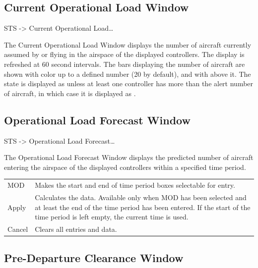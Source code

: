 \documentclass[a4paper,oneside,11pt]{memoir}
\begin{document}
\subsection{Current Operational Load Window}\label{win:colw}

 STS -> Current Operational Load…


The Current Operational Load Window displays the number of aircraft currently assumed by or flying in the airspace of the displayed controllers. The display is refreshed at 60 second intervals. The bars displaying the number of aircraft are shown with  color up to a defined number (20 by default), and with  above it. The state is displayed as  unless at least one controller has more than the alert number of aircraft, in which case it is displayed as .

\subsection{Operational Load Forecast Window}\label{win:olfw}

 STS -> Operational Load Forecast…


The Operational Load Forecast Window displays the predicted number of aircraft entering the airspace of the displayed controllers within a specified time period.

\begin{longtable}{p{2.5cm} p{10cm}}
  MOD     & Makes the start and end of time period boxes selectable for entry.\\
  Apply   & Calculates the data. Available only when MOD has been selected and at least the end of the time period has been entered. If the start of the  time period is left empty, the current time is used.\\
  Cancel  & Clears all entries and data.\\
\end{longtable}

\subsection{Pre-Departure Clearance Window}\label{win:dlpdcw}
\end{document}
